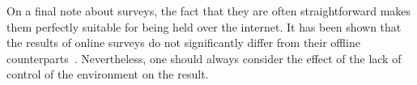 On a final note about surveys, the fact that they are often straightforward makes them perfectly suitable for being held over the internet. It has been shown that the results of online surveys do not significantly differ from their offline counterparts~\cite{komarov2013crowdsourcing}. Nevertheless, one should always consider the effect of the lack of control of the environment on the result.
